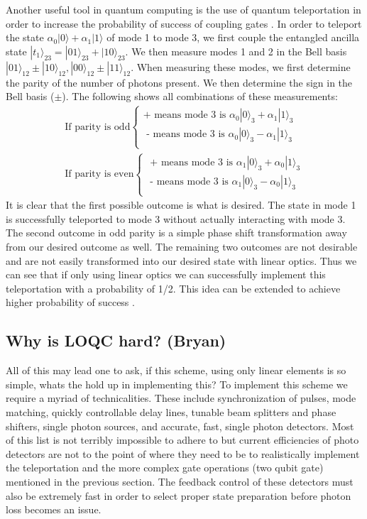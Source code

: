 \documentclass[aps,pra,twocolumn,amsmath,amssymb,nofootinbib,superscriptaddress]{revtex4}
\newcommand{\ket}[1]{|#1\rangle}
\begin{document}
Another useful tool in quantum computing is the use of quantum teleportation in order to increase the probability of success of coupling gates \cite{knill}. In order to teleport the state $\alpha_0 \ket{0} + \alpha_1 \ket{1}$ of mode 1 to mode 3, we first couple the entangled ancilla state $\ket{t_1}_{23} = \ket{01}_{23} + \ket{10}_{23}$. We then measure modes 1 and 2 in the Bell basis $\ket{01}_{12} \pm \ket{10}_{12}, \ket{00}_{12} \pm \ket{11}_{12}$. When measuring these modes, we first determine the parity of the number of photons present. We then determine the sign in the Bell basis ($\pm$). The following shows all combinations of these measurements:
\begin{eqnarray}
\textrm{If parity is odd} \left \{
\begin{array}{c}
\textrm{+ means mode 3 is  } \alpha_0 \ket{0}_3 + \alpha_1 \ket{1}_3  \\
\textrm{ - means mode 3 is  } \alpha_0 \ket{0}_3 - \alpha_1 \ket{1}_3 \\
\end{array} \right . \nonumber\\
\textrm{If parity is even} \left \{
\begin{array}{c}
\textrm{ + means mode 3 is  } \alpha_1 \ket{0}_3 + \alpha_0 \ket{1}_3 \\
\textrm{  - means mode 3 is  } \alpha_1 \ket{0}_3 - \alpha_0 \ket{1}_3 \\
\end{array} \right . \nonumber
\end{eqnarray}
 It is clear that the first possible outcome is what is desired. The state in mode 1 is successfully teleported to mode 3 without actually interacting with mode 3. The second outcome in odd parity is a simple phase shift transformation  away from our desired outcome as well. The remaining two outcomes are not desirable and are not easily transformed into our desired state with linear optics. Thus we can see that if only using linear optics we can successfully implement this teleportation with a probability of 1/2. This idea can be extended to achieve higher probability of success \cite{knill}.

\subsection{Why is LOQC hard? (Bryan)}
All of this may lead one to ask, if this scheme, using only linear elements is so simple, whats the hold up in implementing this? To implement this scheme we require a myriad of technicalities. These include synchronization of pulses, mode matching, quickly controllable delay lines, tunable beam splitters and phase shifters, single photon sources, and accurate, fast, single photon detectors. Most of this list is not terribly impossible to adhere to but current efficiencies of photo detectors are not to the point of where they need to be to realistically implement the teleportation and the more complex gate operations (two qubit gate) mentioned in the previous section. The feedback control of these detectors must also be extremely fast in order to select proper state preparation before photon loss becomes an issue.
\end{document}
